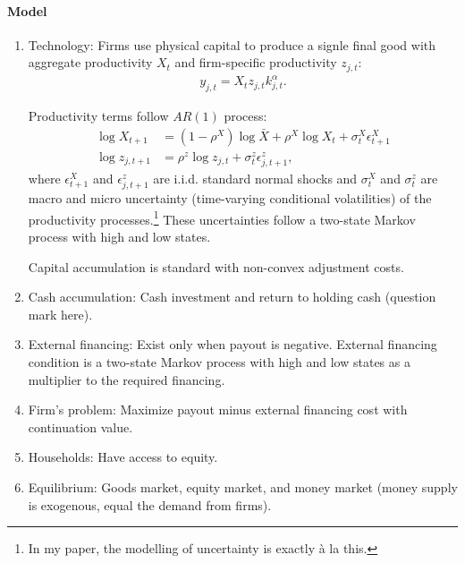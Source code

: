 \documentclass[12pt]{article}
\numberwithin{equation}{section}
\begin{document}
\paragraph{Model}
\begin{enumerate}
    \item Technology: Firms use physical capital to produce a signle final good with aggregate productivity $X_t$ and firm-specific productivity $z_{j,t}$:
    \begin{align*}
        y_{j, t} = X_t z_{j,t } k_{j,t}^{\alpha}.
    \end{align*}
    
    Productivity terms follow $AR(1)$ process:
    \begin{align*}
        \log X_{t+1} &= (1-\rho^X) \log \bar X + \rho^X \log X_{t} + \sigma^X_{t} \epsilon^X_{t+1}\\
        \log z_{j,t+1} &= \rho^z \log z_{j,t} + \sigma^z_t \epsilon^z_{j,t+1},
    \end{align*}
    where $\epsilon^X_{t+1}$ and $\epsilon^z_{j,t+1}$ are i.i.d. standard normal shocks and $\sigma^X_t$ and $\sigma^z_t$ are macro and micro uncertainty (time-varying conditional volatilities) of the productivity processes.\footnote{In my paper, the modelling of uncertainty is exactly à la this.} These uncertainties follow a two-state Markov process with high and low states.

    Capital accumulation is standard with non-convex adjustment costs.
    
    \item Cash accumulation: Cash investment and return to holding cash (question mark here).
    
    \item External financing: Exist only when payout is negative. External financing condition is a two-state Markov process with high and low states as a multiplier to the required financing.
    
    \item Firm's problem: Maximize payout minus external financing cost with continuation value.
    \item Households: Have access to equity.
    \item Equilibrium: Goods market, equity market, and money market (money supply is exogenous, equal the demand from firms).
\end{enumerate}



\end{document}
